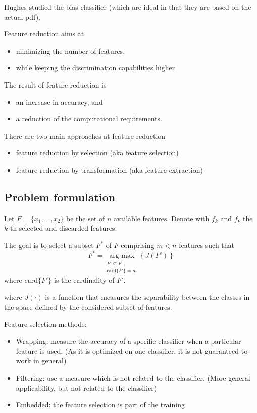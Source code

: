 \documentclass[oneside,onecolumn]{report}
\begin{document}
Hughes studied the bias classifier (which are ideal in that they are based on the actual pdf).

Feature reduction aims at
\begin{itemize}
    \item minimizing the number of features,
    \item while keeping the discrimination capabilities higher
\end{itemize}

The result of feature reduction is
\begin{itemize}
    \item an increase in accuracy, and
    \item a reduction of the computational requirements.
\end{itemize}

There are two main approaches at feature reduction
\begin{itemize}
    \item feature reduction by selection (aka feature selection)
    \item feature reduction by transformation (aka feature extraction)
\end{itemize}

\subsection{Problem formulation}
Let $F = \{ x_1, \dots, x_2 \}$ be the set of $n$ available features.
Denote with $f_k$ and $f_{\overline k}$ the $k$-th selected and discarded features.

The goal is to select a subset $F^*$ of $F$ comprising $m < n$ features such that
$$ F^* =\underset{\substack{ F' \subseteq F, \\  \text{card}\{F'\} = m}}{\text{arg max}} \left\{ J(F') \right\} $$
where $\text{card}\{F'\}$ is the cardinality of $F'$.

where $J(\cdot)$ is a function that measures the separability between the classes in the space defined by the considered subset of features.

Feature selection methods:
\begin{itemize}
    \item Wrapping: measure the accuracy of a specific classifier when a particular feature is used. (As it is optimized on one classifier, it is not guaranteed to work in general)
    \item Filtering: use a measure which is not related to the classifier. (More general applicability, but not related to the classifier)
    \item Embedded: the feature selection is part of the training
\end{itemize}
\end{document}
